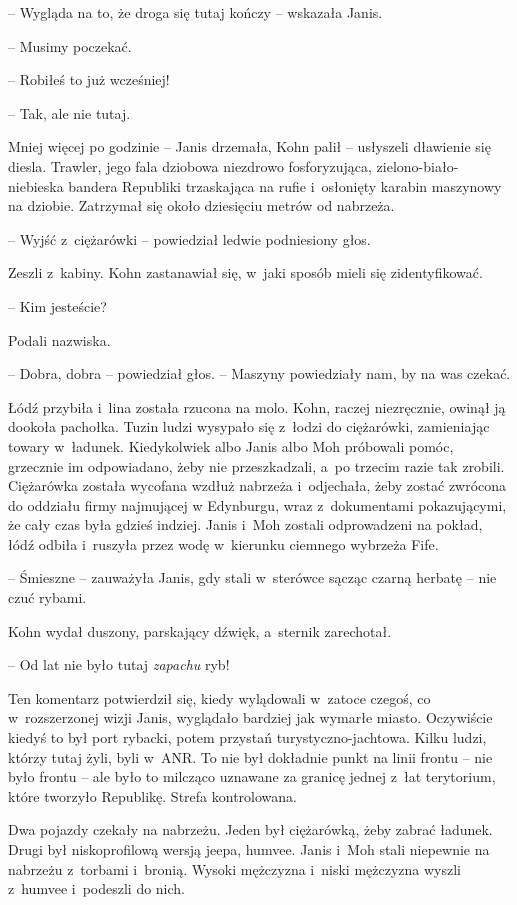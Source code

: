 \documentclass[oneside,polish,11pt,sfheadings]{mwbk}
\begin{document}
-- Wygląda na to, że droga się tutaj kończy -- wskazała Janis.

-- Musimy poczekać.

-- Robiłeś to już wcześniej!

-- Tak, ale nie tutaj.

Mniej więcej po godzinie -- Janis drzemała, Kohn palił -- usłyszeli
dławienie się diesla. Trawler, jego fala dziobowa niezdrowo
fosforyzująca, zielono-biało-niebieska bandera Republiki trzaskająca na
rufie i~osłonięty karabin maszynowy na dziobie. Zatrzymał się około
dziesięciu metrów od nabrzeża.

-- Wyjść z~ciężarówki -- powiedział ledwie podniesiony głos.

Zeszli z~kabiny. Kohn zastanawiał się, w~jaki sposób mieli się
zidentyfikować.

-- Kim jesteście?

Podali nazwiska.

-- Dobra, dobra -- powiedział głos. -- Maszyny powiedziały nam, by na was
czekać.

Łódź przybiła i~lina została rzucona na molo. Kohn, raczej niezręcznie,
owinął ją dookoła pachołka. Tuzin ludzi wysypało się z~łodzi do
ciężarówki, zamieniając towary w~ładunek. Kiedykolwiek albo Janis albo
Moh próbowali pomóc, grzecznie im odpowiadano, żeby nie przeszkadzali, a~po trzecim razie tak zrobili. Ciężarówka została wycofana wzdłuż
nabrzeża i~odjechała, żeby zostać zwrócona do oddziału firmy najmującej
w Edynburgu, wraz z~dokumentami pokazującymi, że cały czas była gdzieś
indziej. Janis i~Moh zostali odprowadzeni na pokład, łódź odbiła i~ruszyła przez wodę w~kierunku ciemnego wybrzeża Fife.

-- Śmieszne -- zauważyła Janis, gdy stali w~sterówce sącząc czarną herbatę
-- nie czuć rybami.

Kohn wydał duszony, parskający dźwięk, a~sternik zarechotał.

-- Od lat nie było tutaj \emph{zapachu} ryb!

Ten komentarz potwierdził się, kiedy wylądowali w~zatoce czegoś, co w~rozszerzonej wizji Janis, wyglądało bardziej jak wymarłe miasto.
Oczywiście kiedyś to był port rybacki, potem przystań
turystyczno-jachtowa. Kilku ludzi, którzy tutaj żyli, byli w~ANR. To nie
był dokładnie punkt na linii frontu -- nie było frontu -- ale było to
milcząco uznawane za granicę jednej z~łat terytorium, które tworzyło
Republikę. Strefa kontrolowana.

Dwa pojazdy czekały na nabrzeżu. Jeden był ciężarówką, żeby zabrać
ładunek. Drugi był niskoprofilową wersją jeepa, humvee. Janis i~Moh
stali niepewnie na nabrzeżu z~torbami i~bronią. Wysoki mężczyzna i~niski
mężczyzna wyszli z~humvee i~podeszli do nich.
\end{document}
